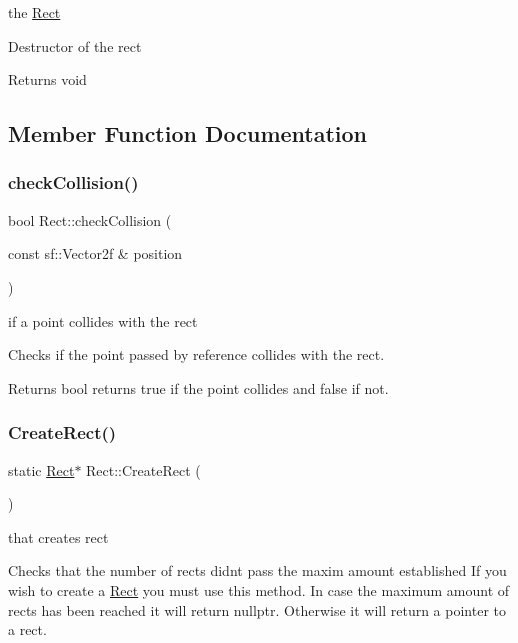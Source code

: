 the \hyperlink{class_rect}{Rect}

Destructor of the rect

\begin{DoxyReturn}{Returns}
void 
\end{DoxyReturn}


\subsection{Member Function Documentation}
\mbox{\label{class_rect_afb4fd23ac0ebf55ef7d9c1bcdcc7ff30}} 
\subsubsection{\texorpdfstring{check\+Collision()}{checkCollision()}}
{\footnotesize\ttfamily bool Rect\+::check\+Collision (\begin{DoxyParamCaption}\item[{const sf\+::\+Vector2f \&}]{position }\end{DoxyParamCaption})}

if a point collides with the rect

Checks if the point passed by reference collides with the rect.

\begin{DoxyReturn}{Returns}
bool returns true if the point collides and false if not. 
\end{DoxyReturn}
\mbox{\label{class_rect_ac9283327c926d453d0cd5a49ded8d150}} 
\subsubsection{\texorpdfstring{Create\+Rect()}{CreateRect()}}
{\footnotesize\ttfamily static \hyperlink{class_rect}{Rect}$\ast$ Rect\+::\+Create\+Rect (\begin{DoxyParamCaption}{ }\end{DoxyParamCaption})\hspace{0.3cm}{\ttfamily [static]}}

that creates rect

Checks that the number of rects didn\textquotesingle{}t pass the maxim amount established If you wish to create a \hyperlink{class_rect}{Rect} you must use this method. In case the maximum amount of rects has been reached it will return nullptr. Otherwise it will return a pointer to a rect.

